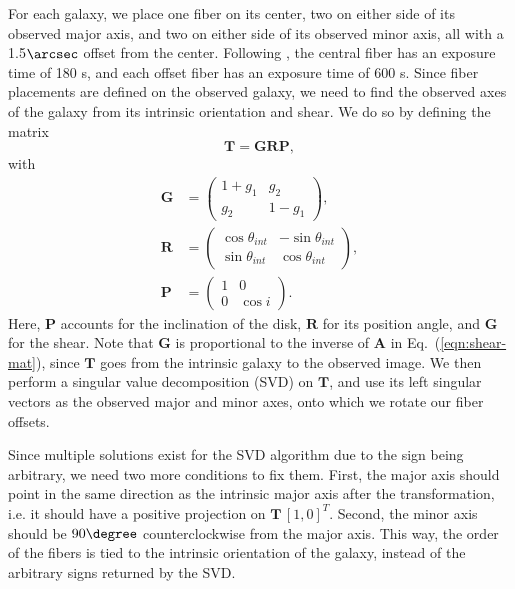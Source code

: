 For each galaxy, we place one fiber on its center, two on either side of its observed major axis, and two on either side of its observed minor axis, all with a 1.5$\arcsec$ offset from the center. Following \citep{KLDESI}, the central fiber has an exposure time of 180 s, and each offset fiber has an exposure time of 600 s. Since fiber placements are defined on the observed galaxy, we need to find the observed axes of the galaxy from its intrinsic orientation and shear. We do so by defining the matrix
\begin{equation}
\label{eqn:fiber-transform}
    \mathbf{T} = \mathbf{G}\mathbf{R}\mathbf{P},
\end{equation}
with
\begin{equation}
\label{eqn:fiber-matrices}
    \begin{aligned}
    \mathbf{G} &= \begin{pmatrix}
    1+g_1 & g_2 \\
    g_2 & 1-g_1
    \end{pmatrix}, \\
    \mathbf{R} &= \begin{pmatrix}
    \cos\theta_{int} & -\sin\theta_{int} \\
    \sin\theta_{int} & \cos\theta_{int}
    \end{pmatrix}, \\
    \mathbf{P} &= \begin{pmatrix}
    1 & 0 \\
    0 & \cos i
    \end{pmatrix}.
    \end{aligned}
\end{equation}
Here, $\mathbf{P}$ accounts for the inclination of the disk, $\mathbf{R}$ for its position angle, and $\mathbf{G}$ for the shear. Note that $\mathbf{G}$ is proportional to the inverse of $\mathbf{A}$ in Eq.~(\ref{eqn:shear-mat}), since $\mathbf{T}$ goes from the intrinsic galaxy to the observed image. We then perform a singular value decomposition (SVD) on $\mathbf{T}$, and use its left singular vectors as the observed major and minor axes, onto which we rotate our fiber offsets.

Since multiple solutions exist for the SVD algorithm due to the sign being arbitrary, we need two more conditions to fix them. First, the major axis should point in the same direction as the intrinsic major axis after the transformation, i.e. it should have a positive projection on $\mathbf{T}\,[1, 0]^T$. Second, the minor axis should be $90\degree$ counterclockwise from the major axis. This way, the order of the fibers is tied to the intrinsic orientation of the galaxy, instead of the arbitrary signs returned by the SVD.

